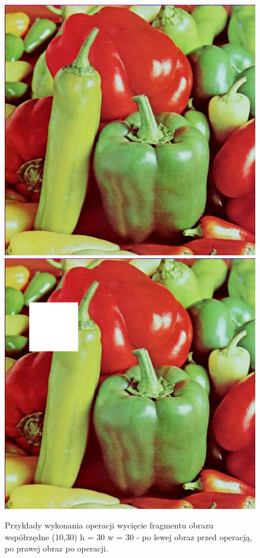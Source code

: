 \documentclass{article}
\begin{document}
\begin{figure}[!htb]
\centering
\includegraphics[scale=0.2]{img/peppers_24bit.png}
\includegraphics[scale=0.2]{img/Wyciety_Fragment_Obraz_peppers_24bit.png} 
\caption{Przykłady wykonania operacji wycięcie fragmentu obrazu współrzędne (10,30) h = 30 w = 30 - po lewej obraz przed operacją, po prawej obraz po operacji. }
\end{figure}
\end{document}
